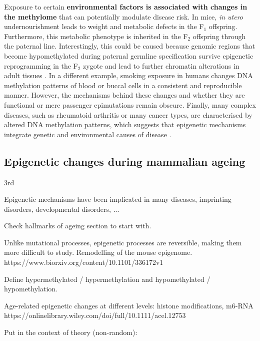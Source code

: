 \bigskip

Exposure to certain \textbf{environmental factors is associated with changes in the methylome} that can potentially modulate disease risk. In mice, \textit{in utero} undernourishment leads to weight and metabolic defects in the F$_1$ offspring. Furthermore, this metabolic phenotype is inherited in the F$_2$ offspring through the paternal line. Interestingly, this could be caused because genomic regions that become hypomethylated during paternal germline specification survive epigenetic reprogramming in the F$_2$ zygote and lead to further chromatin alterations in adult tissues \cite{Radford2014}. In a different example, smoking exposure in humans changes DNA methylation patterns of blood \cite{Roby2016} or buccal cells \cite{Teschendorff2015} in a consistent and reproducible manner. However, the mechanisms behind these changes and whether they are functional or mere passenger epimutations remain obscure. Finally, many complex diseases, such as rheumatoid arthritis or many cancer types, are characterised by altered DNA methylation patterns, which suggests that epigenetic mechanisms integrate genetic and environmental causes of disease \cite{Liu2013,Widschwendter2018}.

\smallskip

\subsection{Epigenetic changes during mammalian ageing}

\smallskip

3rd

Epigenetic mechanisms have been implicated in many diseases, imprinting disorders, developmental disorders, ...

Check hallmarks of ageing section to start with.

Unlike mutational processes, epigenetic processes are reversible, making them more difficult to study.
Remodelling of the mouse epigenome. 
https://www.biorxiv.org/content/10.1101/336172v1

Define hypermethylated / hypermethylation and hypomethylated / hypomethylation.

Age-related epigenetic changes at different levels: histone modifications, m6-RNA https://onlinelibrary.wiley.com/doi/full/10.1111/acel.12753

Put in the context of theory (non-random): %


